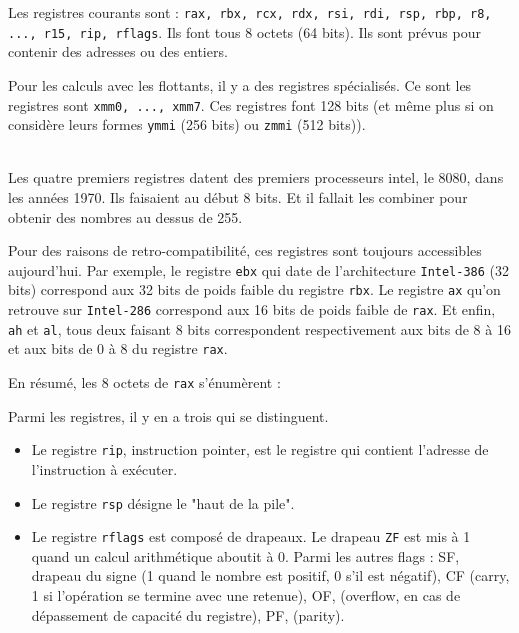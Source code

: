 \documentclass{book}
\newenvironment{commentaire}[1]{%
	\def\FrameCommand{\fboxrule=\FrameRule\fboxsep=\FrameSep \fcolorbox{yellow!50}{yellow!10}}%
	\MakeFramed {\advance\hsize-\width \FrameRestore}
	\noindent {\bf #1}\\
}%
{\endMakeFramed}
\begin{document}
Les registres courants sont : {\tt rax, rbx, rcx, rdx, rsi, rdi, rsp, rbp, r8, ..., r15, rip, rflags}. Ils font tous 8 octets (64 bits). Ils sont prévus pour contenir des adresses ou des entiers.

Pour les calculs avec les flottants, il y a des registres spécialisés. Ce sont les registres sont {\tt xmm0, ..., xmm7}. Ces registres font 128 bits (et même plus si on considère leurs formes {\tt ymmi} (256 bits) ou {\tt zmmi} (512 bits)). 

\begin{commentaire}{Les registres ont une histoire}
Les quatre premiers registres datent des premiers processeurs {\sc intel}, le 8080, dans les années 1970. Ils faisaient au début 8 bits. Et il fallait les combiner pour obtenir des nombres au dessus de 255.
	
Pour des raisons de retro-compatibilité, ces registres sont toujours accessibles aujourd'hui. Par exemple, le registre {\tt ebx} qui date de l'architecture {\tt Intel-386} (32 bits) correspond aux 32 bits de poids faible du registre {\tt rbx}. Le registre {\tt ax} qu'on retrouve sur {\tt Intel-286} correspond aux 16 bits de poids faible de {\tt rax}. Et enfin, {\tt ah} et {\tt al}, tous deux faisant 8 bits correspondent respectivement aux bits de 8 à 16 et aux bits de 0 à 8 du registre {\tt rax}.
	
En résumé, les 8 octets de {\tt rax} s'énumèrent :
	\begin{center}
	\end{center}
\end{commentaire}

Parmi les registres, il y en a trois qui se distinguent. 
\begin{itemize}
	\item Le registre {\tt rip}, instruction pointer, est le registre qui contient l'adresse de l'instruction à exécuter. 
	\item Le registre {\tt rsp} désigne le "haut de la pile". 
	\item Le registre {\tt rflags} est composé de drapeaux. Le drapeau {\tt ZF} est mis à 1 quand un calcul arithmétique aboutit à 0. Parmi les autres flags : SF, drapeau du signe (1 quand le nombre est positif, 0 s'il est négatif), CF (carry, 1 si l'opération se termine avec une retenue), OF, (overflow, en cas de dépassement de capacité du registre), PF, (parity). 
\end{itemize} 
\end{document}
